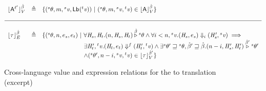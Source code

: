 \begin{figure*}[!htbp]
\begin{displaymath}
\begin{array}{lll}
      \fcUlrvn  {\utype^{\llabel'}} & \triangleq & \{(\uWorlds, m, \sval, \elabel {} (\tval)) ~|~
                                                   (\uWorlds, m, \sval, \tval) \in
                                                   \fclrvun {\utype} {\pb}    \} \\ \\
\hline \\                                                   
    \fcUlren {\tau} & \triangleq & \{(\uWorlds, n,  e_s, e_t) ~|~ 
                     \forall \heap_s, \heap_t. (n, \heap_s, \heap_t)
                        \wDefined{\pb} \uWorlds \wedge
                        \forall i<n, \sval. (\heap_s, e_s) \ReducesTo{i} (\heap_s',\sval) \implies \\
                    & & \hspace{24mm}\exists \heap_t', \tval. (\heap_t, e_t) \ReducesToF{} (\heap_t',\tval) \wedge
                        \exists  \uWorlds' \wExtendsR \uWorlds, \pb' \wExtendsR \pb. (n-i,\heap_s', \heap_t')
                        \wDefined{\pb'} \uWorlds' \\
                    & & \hspace{24mm}\wedge (\uWorlds', n-i, \sval, \tval) \in \fclrvun {\tau} {\pb'}
                        \}                                          
  \end{array}
\end{displaymath}
\caption{Cross-language value and expression relations for the {\fg} to {\cg} translation (excerpt)}
\label{fig:crossLangfg2cg}
\end{figure*}

